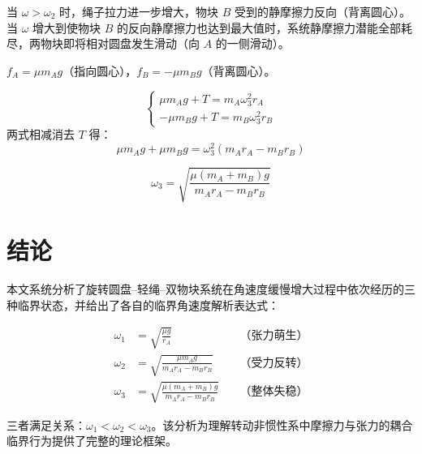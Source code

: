 \documentclass[12pt,a4paper]{ctexart}
\begin{document}
\begin{description}[leftmargin=1.5cm,style=nextline]
  \item[物理机制] 当 $\omega > \omega_2$ 时，绳子拉力进一步增大，物块 $B$ 受到的静摩擦力反向（背离圆心）。当 $\omega$ 增大到使物块 $B$ 的反向静摩擦力也达到最大值时，系统静摩擦力潜能全部耗尽，两物块即将相对圆盘发生滑动（向 $A$ 的一侧滑动）。
  \item[临界条件] $f_A = \mu m_A g$（指向圆心），$f_B = -\mu m_B g$（背离圆心）。
  \item[代数推导]
  \begin{equation}
  \begin{cases}
  \mu m_A g + T = m_A \omega_3^2 r_A \\[6pt]
  -\mu m_B g + T = m_B \omega_3^2 r_B
  \end{cases}
  \end{equation}
  两式相减消去 $T$ 得：
  \begin{equation}
  \mu m_A g + \mu m_B g = \omega_3^2 (m_A r_A - m_B r_B)
  \end{equation}
  \item[临界角速度]
  \begin{equation}
  \boxed{\omega_3 = \sqrt{\frac{\mu (m_A + m_B) g}{m_A r_A - m_B r_B}}}
  \end{equation}
\end{description}

\section*{结论}

本文系统分析了旋转圆盘--轻绳--双物块系统在角速度缓慢增大过程中依次经历的三种临界状态，并给出了各自的临界角速度解析表达式：

\begin{align}
\omega_1 &= \sqrt{\frac{\mu g}{r_A}} \quad &\text{（张力萌生）} \\[8pt]
\omega_2 &= \sqrt{\frac{\mu m_A g}{m_A r_A - m_B r_B}} \quad &\text{（受力反转）} \\[8pt]
\omega_3 &= \sqrt{\frac{\mu (m_A + m_B) g}{m_A r_A - m_B r_B}} \quad &\text{（整体失稳）}
\end{align}

三者满足关系：$\omega_1 < \omega_2 < \omega_3$。该分析为理解转动非惯性系中摩擦力与张力的耦合临界行为提供了完整的理论框架。
\end{document}
